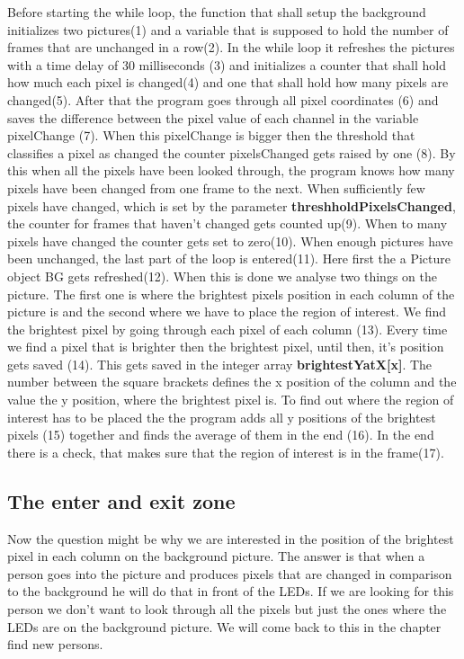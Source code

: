 Before starting the while loop, the function that shall setup the background initializes two pictures(1) and a variable that is supposed to hold the number of frames that are unchanged in a row(2). In the while loop it refreshes the pictures with a time delay of 30 milliseconds (3) and initializes a counter that shall hold how much each pixel is changed(4) and one that shall hold how many pixels are changed(5). After that the program goes through all pixel coordinates (6) and saves the difference between the pixel value of each channel in the variable pixelChange (7). When this pixelChange is bigger then the threshold that classifies a pixel as changed the counter pixelsChanged gets raised by one (8). By this when all the pixels have been looked through, the program knows how many pixels have been changed from one frame to the next. When sufficiently few pixels have changed, which is set by the parameter \textbf{threshholdPixelsChanged}, the counter for frames that haven't changed gets counted up(9). When to many pixels have changed the counter gets set to zero(10). 
When enough pictures have been unchanged, the last part of the loop is entered(11). Here first the a Picture object BG gets refreshed(12). When this is done we analyse two things on the picture. The first one is where the brightest pixels position in each column of the picture is and the second where we have to place the region of interest. We find the brightest pixel by going through each pixel of each column (13). Every time we find a pixel that is brighter then the brightest pixel, until then, it's position gets saved (14). This gets saved in the integer array \textbf{brightestYatX[x]}. The number between the square brackets defines the x position of the column and the value the y position, where the brightest pixel is. To find out where the region of interest has to be placed the the program adds all y positions of the brightest pixels (15) together and finds the average of them in the end (16). In the end there is a check, that makes sure that the region of interest is in the frame(17).

\subsection{The enter and exit zone}
Now the question might be why we are interested in the position of the brightest pixel in each column on the background picture. The answer is that when a person goes into the picture and produces pixels that are changed in comparison to the background he will do that in front of the LEDs. If we are looking for this person we don't want to look through all the pixels but just the ones where the LEDs are on the background picture. We will come back to this in the chapter find new persons. 

